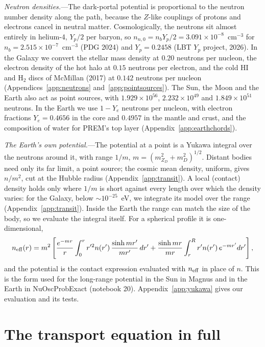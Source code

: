 \documentclass[11pt,a4paper]{article}
\newcommand{\mzd}{m_{Z_D}}
\begin{document}
\textit{Neutron densities.}---The dark-portal potential is proportional to the neutron number
density along the path, because the $Z$-like couplings of protons and electrons cancel in neutral
matter. Cosmologically, the neutrons sit almost entirely in helium-4, $Y_p/2$ per baryon, so
$n_{n,0} = n_b Y_p/2 = 3.091\times10^{-8}$~cm$^{-3}$ for $n_b = 2.515\times10^{-7}$~cm$^{-3}$
(PDG 2024) and $Y_p = 0.2458$ (LBT $Y_p$ project, 2026). In the Galaxy we convert the stellar mass
density at $0.20$ neutrons per nucleon, the electron density of the hot halo at $0.15$ neutrons per
electron, and the cold HI and H$_2$ discs of McMillan (2017) at $0.142$ neutrons per nucleon
(Appendices~\ref{app:neutrons} and~\ref{app:pointsources}). The Sun, the Moon and the Earth
also act as point sources, with $1.929\times10^{56}$, $2.232\times10^{49}$ and
$1.849\times10^{51}$ neutrons. In the Earth we use $1-Y_e$ neutrons per nucleon, with electron fractions
$Y_e = 0.4656$ in the core and $0.4957$ in the mantle and crust, and the composition of water for
PREM's top layer (Appendix~\ref{app:earthchords}).

\textit{The Earth's own potential.}---The potential at a point is a Yukawa integral over the
neutrons around it, with range $1/m$, $m = (\mzd^2 + m_D^2)^{1/2}$. Distant bodies need only its
far limit, a point source; the cosmic mean density, uniform, gives $n/m^2$, cut at the Hubble
radius (Appendix~\ref{app:transit}). A local (contact) density holds only where $1/m$ is short
against every length over which the density varies: for the Galaxy, below $\sim10^{-25}$~eV, we
integrate its model over the range (Appendix~\ref{app:transit}). Inside the Earth the range can
match the size of the body, so we evaluate the integral itself. For a spherical profile it is one-dimensional,
\begin{equation}
n_{\rm eff}(r) = m^2\left[\frac{e^{-mr}}{r}\int_0^r r'^2 n(r')\,\frac{\sinh mr'}{mr'}\,dr'
+ \frac{\sinh mr}{mr}\int_r^R r' n(r')\,e^{-mr'}dr'\right],
\label{eq:yukawa}
\end{equation}
and the potential is the contact expression evaluated with $n_{\rm eff}$ in place of $n$. This is
the form used for the long-range potential in the Sun in Magnus and in the Earth in NuOscProbExact
(notebook 20). Appendix~\ref{app:yukawa} gives our evaluation and its tests.

\section{The transport equation in full}
\label{sec:full_transport}
\end{document}
